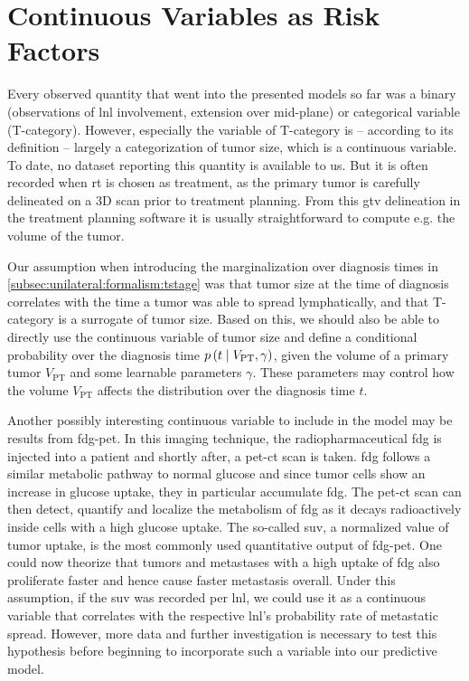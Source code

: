 \documentclass[\relativeRoot/main.tex]{subfiles}
\begin{document}
\section{Continuous Variables as Risk Factors}
\label{sec:future:continuous}

Every observed quantity that went into the presented models so far was a binary (observations of \gls{lnl} involvement, extension over mid-plane) or categorical variable (T-category). However, especially the variable of T-category is -- according to its definition \cite{brierley_tnm_2017} -- largely a categorization of tumor size, which is a continuous variable. To date, no dataset reporting this quantity is available to us. But it is often recorded when \acrlong{rt} is chosen as treatment, as the primary tumor is carefully delineated on a 3D scan prior to treatment planning. From this \gls{gtv} delineation in the treatment planning software it is usually straightforward to compute e.g. the volume of the tumor.

Our assumption when introducing the marginalization over diagnosis times in \cref{subsec:unilateral:formalism:tstage} was that tumor size at the time of diagnosis correlates with the time a tumor was able to spread lymphatically, and that T-category is a surrogate of tumor size. Based on this, we should also be able to directly use the continuous variable of tumor size and define a conditional probability over the diagnosis time $p \left( t \mid V_\text{PT}, \gamma \right)$, given the volume of a primary tumor $V_\text{PT}$ and some learnable parameters $\gamma$. These parameters may control how the volume $V_\text{PT}$ affects the distribution over the diagnosis time $t$.

Another possibly interesting continuous variable to include in the model may be results from \gls{fdg-pet}. In this imaging technique, the radiopharmaceutical \gls{fdg} is injected into a patient and shortly after, a \acrshort{pet}-\acrshort{ct} scan is taken. \Gls{fdg} follows a similar metabolic pathway to normal glucose and since tumor cells show an increase in glucose uptake, they in particular accumulate \gls{fdg}. The \acrshort{pet}-\acrshort{ct} scan can then detect, quantify and localize the metabolism of \gls{fdg} as it decays radioactively inside cells with a high glucose uptake. The so-called \gls{suv}, a normalized value of tumor uptake, is the most commonly used quantitative output of \gls{fdg-pet}. One could now theorize that tumors and metastases with a high uptake of \gls{fdg} also proliferate faster and hence cause faster metastasis overall. Under this assumption, if the \gls{suv} was recorded per \gls{lnl}, we could use it as a continuous variable that correlates with the respective \gls{lnl}'s probability rate of metastatic spread. However, more data and further investigation is necessary to test this hypothesis before beginning to incorporate such a variable into our predictive model.
\end{document}
